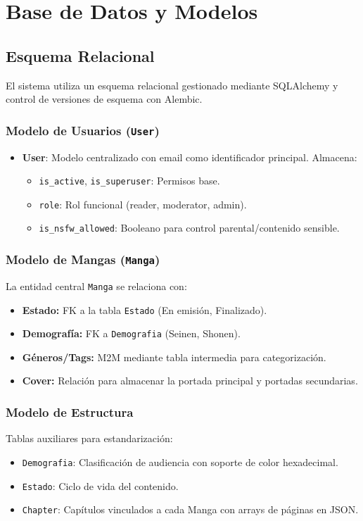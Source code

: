 \section{Base de Datos y Modelos}

\subsection{Esquema Relacional}
El sistema utiliza un esquema relacional gestionado mediante SQLAlchemy y control de versiones de esquema con Alembic.

\subsubsection{Modelo de Usuarios (\texttt{User})}
\begin{itemize}
    \item \textbf{User}: Modelo centralizado con email como identificador principal. Almacena:
    \begin{itemize}
        \item \texttt{is\_active}, \texttt{is\_superuser}: Permisos base.
        \item \texttt{role}: Rol funcional (reader, moderator, admin).
        \item \texttt{is\_nsfw\_allowed}: Booleano para control parental/contenido sensible.
    \end{itemize}
\end{itemize}

\subsubsection{Modelo de Mangas (\texttt{Manga})}
La entidad central \texttt{Manga} se relaciona con:
\begin{itemize}
    \item \textbf{Estado:} FK a la tabla \texttt{Estado} (En emisión, Finalizado).
    \item \textbf{Demografía:} FK a \texttt{Demografia} (Seinen, Shonen).
    \item \textbf{Géneros/Tags:} M2M mediante tabla intermedia para categorización.
    \item \textbf{Cover:} Relación para almacenar la portada principal y portadas secundarias.
\end{itemize}

\subsubsection{Modelo de Estructura}
Tablas auxiliares para estandarización:
\begin{itemize}
    \item \texttt{Demografia}: Clasificación de audiencia con soporte de color hexadecimal.
    \item \texttt{Estado}: Ciclo de vida del contenido.
    \item \texttt{Chapter}: Capítulos vinculados a cada Manga con arrays de páginas en JSON.
\end{itemize}

